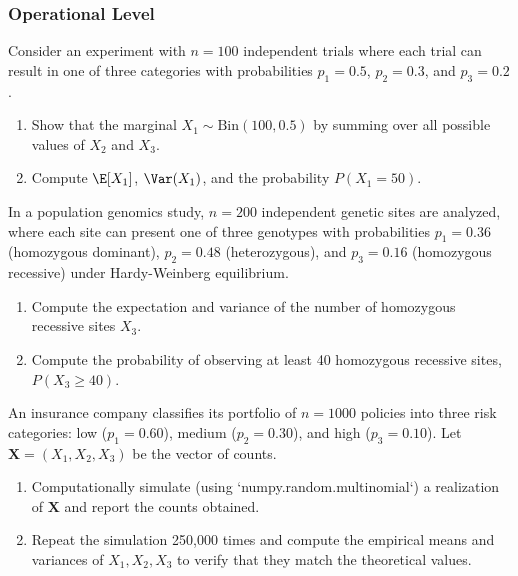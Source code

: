 \subsubsection*{Operational Level}

\begin{problema}
	\label{prob:3.8.4}
	Consider an experiment with $n = 100$ independent trials where each trial can result in one of three categories with probabilities $p_{1} = 0.5$, $p_{2} = 0.3$, and $p_{3} = 0.2$.
	\begin{enumerate}
		\item Show that the marginal $X_{1} \sim \text{Bin}(100, 0.5)$ by summing over all possible values of $X_{2}$ and $X_{3}$.
		\item Compute $\E[X_{1}]$, $\Var(X_{1})$, and the probability $P(X_{1} = 50)$.
	\end{enumerate}
\end{problema}

\begin{problema}
	\label{prob:3.8.5}
	In a population genomics study, $n = 200$ independent genetic sites are analyzed, where each site can present one of three genotypes with probabilities $p_{1} = 0.36$ (homozygous dominant), $p_{2} = 0.48$ (heterozygous), and $p_{3} = 0.16$ (homozygous recessive) under Hardy-Weinberg equilibrium.
	\begin{enumerate}
		\item Compute the expectation and variance of the number of homozygous recessive sites $X_{3}$.
		\item Compute the probability of observing at least 40 homozygous recessive sites, $P(X_{3} \ge 40)$.
	\end{enumerate}
\end{problema}

\begin{problema}
	\label{prob:3.8.6}
	An insurance company classifies its portfolio of $n = 1000$ policies into three risk categories: low ($p_{1} = 0.60$), medium ($p_{2} = 0.30$), and high ($p_{3} = 0.10$). Let $\bm{X} = (X_{1}, X_{2}, X_{3})$ be the vector of counts.
	\begin{enumerate}
		\item Computationally simulate (using `numpy.random.multinomial`) a realization of $\bm{X}$ and report the counts obtained.
		\item Repeat the simulation 250{,}000 times and compute the empirical means and variances of $X_{1}, X_{2}, X_{3}$ to verify that they match the theoretical values.
	\end{enumerate}
\end{problema}

